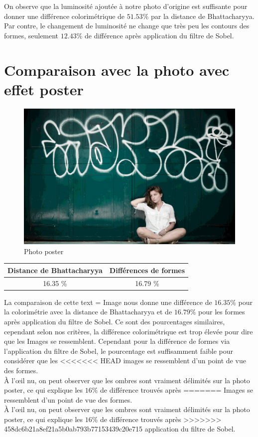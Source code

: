\documentclass[]{article}
\begin{document}
\begin{description}
On observe que la luminosité ajoutée à notre photo d'origine est
suffisante pour donner une différence colorimétrique de $51.53 \%$ par la
distance de Bhattacharyya. Par contre, le changement de luminosité ne
change que très peu les contours des formes, seulement $12.43 \%$ de
différence après application du filtre de Sobel.

\newpage

\section{Comparaison avec la photo avec effet
poster}\label{comparaison-avec-la-photo-avec-effet-poster}

\begin{figure}[htbp]
\centering
\includegraphics{photos/poster.jpg}
\caption{Photo poster}
\end{figure}

\begin{center}
\begin{tabular}{|c|c|}
  \hline
  Distance de Bhattacharyya & Différences de formes \\
  \hline
  16.35 \% & 16.79 \% \\
  \hline
\end{tabular}
\end{center}


La comparaison de cette text = Image nous donne une différence de $16.35 \%$
pour la colorimétrie avec la distance de Bhattacharyya et de $16.79 \%$
pour les formes après application du filtre de Sobel. Ce sont des
pourcentages similaires, cependant selon nos critères, la différence
colorimétrique est trop élevée pour dire que les Images se ressemblent.
Cependant pour la différence de formes via l'application du filtre de
Sobel, le pourcentage est suffisamment faible pour considérer que les
<<<<<<< HEAD
images se ressemblent d'un point de vue des formes. \\
À l'\oe il nu, on peut observer que les ombres sont vraiment délimités sur la
photo poster, ce qui explique les $16\%$ de différence trouvés après
=======
Images se ressemblent d'un point de vue des formes. \\
À l'\oe il nu, on peut observer que les ombres sont vraiment délimités sur la
photo poster, ce qui explique les $16 \%$ de différence trouvés après
>>>>>>> 458dc6b21a8ef21a5b0ab793b77153439c20e715
application du filtre de Sobel.


\end{description}
\end{document}

